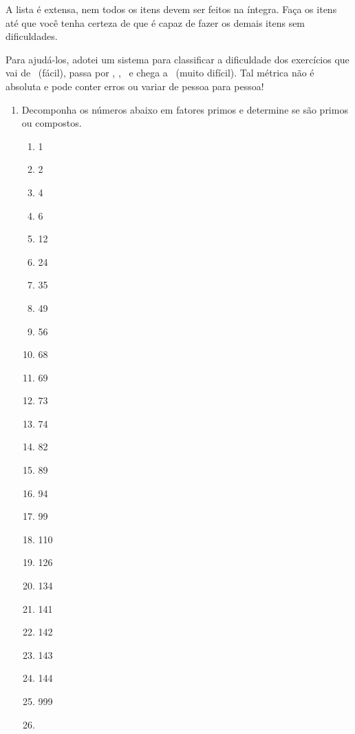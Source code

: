 \documentclass[12pt]{report}
\newcommand{\1}{\faThermometerEmpty}
\newcommand{\2}{\faThermometerQuarter}
\newcommand{\3}{\faThermometerHalf}
\newcommand{\4}{\faThermometerThreeQuarters}
\newcommand{\5}{\faThermometerFull}
\begin{document}
A lista é extensa, nem todos os itens devem ser feitos na íntegra. Faça os itens até que você tenha certeza de que é capaz de fazer os demais itens sem dificuldades. 

Para ajudá-los, adotei um sistema para classificar a dificuldade dos exercícios que vai de \1 \ (fácil), passa por \2 , \3 , \4 \ e chega a \5 \ (muito difícil). Tal métrica não é absoluta e pode conter erros ou variar de pessoa para pessoa!

\vspace{5mm}

\begin{enumerate}
\item Decomponha os números abaixo em fatores primos e determine se são primos ou compostos. \1
\begin{multicols}{4}
  \begin{enumerate}
    \item 1
    \item 2
    \item 4
    \item 6
    \item 12
    \item 24
    \item 35
    \item 49
    \item 56
    \item 68
    \item 69
    \item 73
    \item 74
    \item 82
    \item 89
    \item 94
    \item 99
    \item 110
    \item 126
    \item 134
    \item 141
    \item 142
    \item 143
    \item 144
    \item 999
    \item \2 27.720
    
    \end{enumerate}
\end{multicols}


\end{enumerate}
\end{document}
